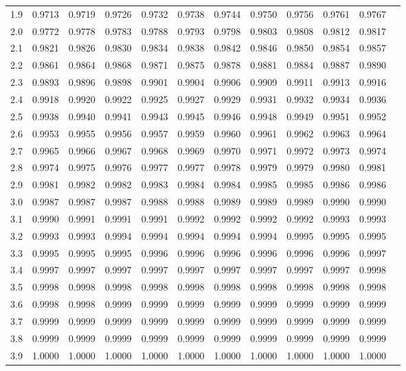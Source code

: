 \documentclass[12pt,a4paper,openany,twoside]{report}
\theoremstyle{definition}
\theoremstyle{remark}
\theoremstyle{plain}
\theoremstyle{definition}
\theoremstyle{definition}
\theoremstyle{definition}
\theoremstyle{remark}
\begin{document}
\begin{center}
\begin{tabular}{rr@{\ }r@{\ }r@{\ }r@{\ }r@{\ }r@{\ }r@{\ }r@{\ }r@{\ }r@{\ }r}
1.9&0.9713&0.9719&0.9726&0.9732&0.9738&0.9744&0.9750&0.9756&0.9761&0.9767\\
2.0&0.9772&0.9778&0.9783&0.9788&0.9793&0.9798&0.9803&0.9808&0.9812&0.9817\\
2.1&0.9821&0.9826&0.9830&0.9834&0.9838&0.9842&0.9846&0.9850&0.9854&0.9857\\
2.2&0.9861&0.9864&0.9868&0.9871&0.9875&0.9878&0.9881&0.9884&0.9887&0.9890\\
2.3&0.9893&0.9896&0.9898&0.9901&0.9904&0.9906&0.9909&0.9911&0.9913&0.9916\\
2.4&0.9918&0.9920&0.9922&0.9925&0.9927&0.9929&0.9931&0.9932&0.9934&0.9936\\
2.5&0.9938&0.9940&0.9941&0.9943&0.9945&0.9946&0.9948&0.9949&0.9951&0.9952\\
2.6&0.9953&0.9955&0.9956&0.9957&0.9959&0.9960&0.9961&0.9962&0.9963&0.9964\\
2.7&0.9965&0.9966&0.9967&0.9968&0.9969&0.9970&0.9971&0.9972&0.9973&0.9974\\
2.8&0.9974&0.9975&0.9976&0.9977&0.9977&0.9978&0.9979&0.9979&0.9980&0.9981\\
2.9&0.9981&0.9982&0.9982&0.9983&0.9984&0.9984&0.9985&0.9985&0.9986&0.9986\\
3.0&0.9987&0.9987&0.9987&0.9988&0.9988&0.9989&0.9989&0.9989&0.9990&0.9990\\
3.1&0.9990&0.9991&0.9991&0.9991&0.9992&0.9992&0.9992&0.9992&0.9993&0.9993\\
3.2&0.9993&0.9993&0.9994&0.9994&0.9994&0.9994&0.9994&0.9995&0.9995&0.9995\\
3.3&0.9995&0.9995&0.9995&0.9996&0.9996&0.9996&0.9996&0.9996&0.9996&0.9997\\
3.4&0.9997&0.9997&0.9997&0.9997&0.9997&0.9997&0.9997&0.9997&0.9997&0.9998\\
3.5&0.9998&0.9998&0.9998&0.9998&0.9998&0.9998&0.9998&0.9998&0.9998&0.9998\\
3.6&0.9998&0.9998&0.9999&0.9999&0.9999&0.9999&0.9999&0.9999&0.9999&0.9999\\
3.7&0.9999&0.9999&0.9999&0.9999&0.9999&0.9999&0.9999&0.9999&0.9999&0.9999\\
3.8&0.9999&0.9999&0.9999&0.9999&0.9999&0.9999&0.9999&0.9999&0.9999&0.9999\\
3.9&1.0000&1.0000&1.0000&1.0000&1.0000&1.0000&1.0000&1.0000&1.0000&1.0000\\
\end{tabular}
\end{center}

\newpage
\end{document}
